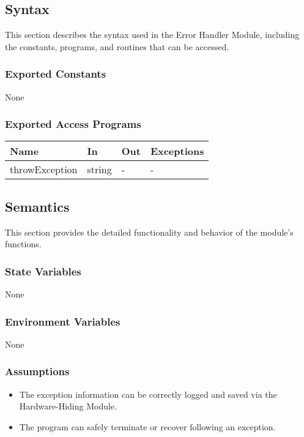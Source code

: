 \documentclass[12pt, titlepage]{article}
\begin{document}
\subsection{Syntax}

This section describes the syntax used in the Error Handler Module, including
the constants, programs, and routines that can be accessed.

\subsubsection{Exported Constants}

None

\subsubsection{Exported Access Programs}

\begin{center}
\begin{tabular}{p{3cm} p{4cm} p{4cm} p{2cm}}
\hline
\textbf{Name} & \textbf{In} & \textbf{Out} & \textbf{Exceptions} \\
\hline
throwException & string & - & - \\
\hline
\end{tabular}
\end{center}

\subsection{Semantics}

This section provides the detailed functionality and behavior of the module’s
functions.

\subsubsection{State Variables}

None

\subsubsection{Environment Variables}

None

\subsubsection{Assumptions}

\begin{itemize}
\item The exception information can be correctly logged and saved via the
Hardware-Hiding Module.
\item The program can safely terminate or recover following an exception.
\end{itemize}
\end{document}
